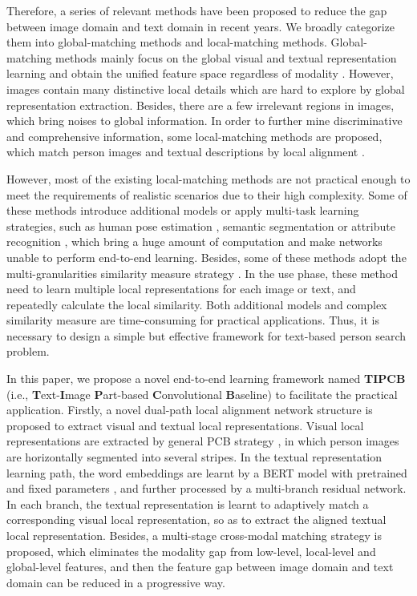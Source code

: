 \documentclass[review]{elsarticle}
\begin{document}
Therefore, a series of relevant methods have been proposed to reduce the gap between image domain and text domain in recent years. We broadly categorize them into global-matching methods and local-matching methods. Global-matching methods mainly focus on the global visual and textual representation learning and obtain the unified feature space regardless of modality \cite{7, 8, 10, 11, 12, 13, 14, 15}. However, images contain many distinctive local details which are hard to explore by global representation extraction. Besides, there are a few irrelevant regions in images, which bring noises to global information. In order to further mine discriminative and comprehensive information, some local-matching methods are proposed, which match person images and textual descriptions by local alignment \cite{9, 16, 17, 18, 19, 20, 21}.

However, most of the existing local-matching methods are not practical enough to meet the requirements of realistic scenarios due to their high complexity. Some of these methods introduce additional models or apply multi-task learning strategies, such as human pose estimation \cite{17, 22, 23}, semantic segmentation \cite{18, 24} or attribute recognition \cite{21, 25}, which bring a huge amount of computation and make networks unable to perform end-to-end learning. Besides, some of these methods adopt the multi-granularities similarity measure strategy \cite{16, 19}. In the use phase, these method need to learn multiple local representations for each image or text, and repeatedly calculate the local similarity. Both additional models and complex similarity measure are time-consuming for practical applications. Thus, it is necessary to design a simple but effective framework for text-based person search problem.

In this paper, we propose a novel end-to-end learning framework named \textbf{TIPCB} (i.e., \textbf{T}ext-\textbf{I}mage \textbf{P}art-based \textbf{C}onvolutional \textbf{B}aseline) to facilitate the practical application. Firstly, a novel dual-path local alignment network structure is proposed to extract visual and textual local representations. Visual local representations are extracted by general PCB strategy \cite{2}, in which person images are horizontally segmented into several stripes. In the textual representation learning path, the word embeddings are learnt by a BERT model with pretrained and fixed parameters \cite{26}, and further processed by a multi-branch residual network. In each branch, the textual representation is learnt to adaptively match a corresponding visual local representation, so as to extract the aligned textual local representation. Besides, a multi-stage cross-modal matching strategy is proposed, which eliminates the modality gap from low-level, local-level and global-level features, and then the feature gap between image domain and text domain can be reduced in a progressive way.
\end{document}
